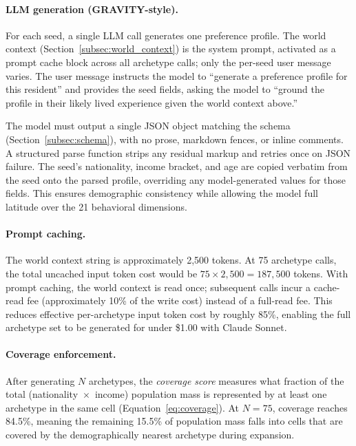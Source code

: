 \documentclass[sustainability,article,submit,pdftex,moreauthors]{Definitions/mdpi}
\begin{document}
\paragraph{LLM generation (GRAVITY-style).}
For each seed, a single LLM call generates one preference profile. The
world context (Section~\ref{subsec:world_context}) is the system prompt,
activated as a prompt cache block across all archetype calls; only the
per-seed user message varies. The user message instructs the model to
``generate a preference profile for this resident'' and provides the seed
fields, asking the model to ``ground the profile in their likely lived
experience given the world context above.''

The model must output a single JSON object matching the schema
(Section~\ref{subsec:schema}), with no prose, markdown fences, or inline
comments. A structured parse function strips any residual markup and
retries once on JSON failure. The seed's nationality, income bracket, and
age are copied verbatim from the seed onto the parsed profile, overriding
any model-generated values for those fields. This ensures demographic
consistency while allowing the model full latitude over the 21 behavioral
dimensions.

\paragraph{Prompt caching.}
The world context string is approximately 2,500 tokens. At 75 archetype
calls, the total uncached input token cost would be $75 \times 2{,}500
= 187{,}500$ tokens. With prompt caching, the world context is read once;
subsequent calls incur a cache-read fee (approximately 10\% of the write
cost) instead of a full-read fee. This reduces effective per-archetype
input token cost by roughly 85\%, enabling the full archetype set to be
generated for under \$1.00 with Claude Sonnet.

\paragraph{Coverage enforcement.}
After generating $N$ archetypes, the \emph{coverage score} measures what
fraction of the total (nationality~$\times$~income) population mass is
represented by at least one archetype in the same cell
(Equation~\eqref{eq:coverage}). At $N = 75$, coverage reaches 84.5\%,
meaning the remaining 15.5\% of population mass falls into cells that
are covered by the demographically nearest archetype during expansion.
\end{document}
